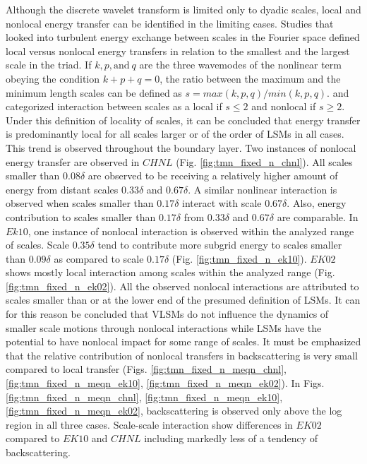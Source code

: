 Although the discrete wavelet transform is limited only to dyadic scales, local and nonlocal energy transfer can be identified in the limiting cases. Studies that looked into turbulent energy exchange between scales in the Fourier space defined local versus nonlocal energy transfers in relation to the smallest and the largest scale in the triad. If $k,p, \text{and}\ q$ are the three wavemodes of the nonlinear term obeying the condition $k+p+q=0$, the ratio between the maximum and the minimum length scales can be defined as $s=max(k,p,q)/min(k,p,q)$. \citet{domaradzki_pof_1994} and \citet{bourouiba_straub_jfm11} categorized interaction between scales as a local if $s\leq 2$ and nonlocal if $s\geq 2$. Under this definition of locality of scales, it can be concluded that energy transfer is predominantly local for all scales larger or of the order of LSMs in all cases. This trend is observed throughout the boundary layer. Two instances of nonlocal energy transfer are observed in $CHNL$ (Fig. \ref{fig:tmn_fixed_n_chnl}). All scales smaller than $0.08\delta$ are observed to be receiving a relatively higher amount of energy from distant scales $0.33\delta$ and $0.67\delta$. A similar nonlinear interaction is observed when scales smaller than $0.17\delta$ interact with scale $0.67\delta$. Also, energy contribution to scales smaller than $0.17\delta$ from $0.33\delta$ and $0.67\delta$ are comparable. In  $Ek10$, one instance of nonlocal interaction is observed within the analyzed range of scales. Scale $0.35\delta$ tend to contribute more subgrid energy to scales smaller than $0.09\delta$ as compared to scale $0.17\delta$ (Fig. \ref{fig:tmn_fixed_n_ek10}). $EK02$ shows mostly local interaction among scales within the analyzed range (Fig. \ref{fig:tmn_fixed_n_ek02}). All the observed nonlocal interactions are attributed to scales smaller than or at the lower end of the presumed definition of LSMs. It can for this reason be concluded that VLSMs do not influence the dynamics of smaller scale motions through nonlocal interactions while LSMs have the potential to have nonlocal impact for some range of scales. It must be emphasized that the relative contribution of nonlocal transfers in backscattering is very small compared to local transfer (Figs. \ref{fig:tmn_fixed_n_meqn_chnl}, \ref{fig:tmn_fixed_n_meqn_ek10}, \ref{fig:tmn_fixed_n_meqn_ek02}). In Figs. \ref{fig:tmn_fixed_n_meqn_chnl}, \ref{fig:tmn_fixed_n_meqn_ek10}, \ref{fig:tmn_fixed_n_meqn_ek02}, backscattering is observed only above the log region in all three cases. Scale-scale interaction show differences in $EK02$ compared to $EK10$ and $CHNL$ including markedly less of a tendency of backscattering. 

